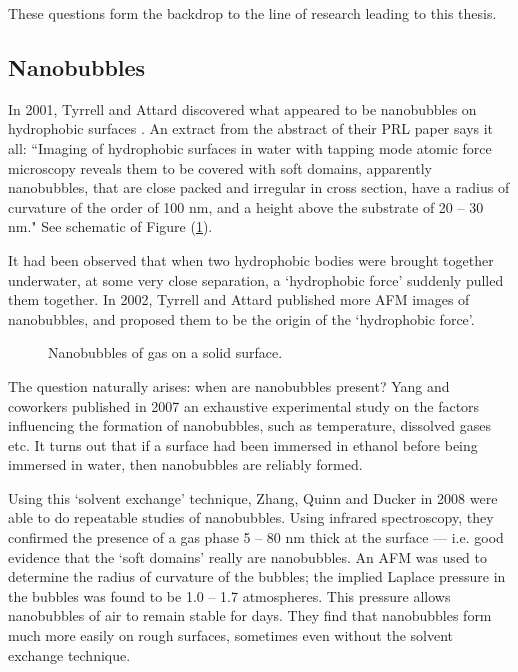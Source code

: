 \documentclass[12pt, a4paper, twoside, openright]{book}
\begin{document}
These questions form the backdrop to the line of research leading to this thesis.

\subsection{Nanobubbles}

In 2001, Tyrrell and Attard discovered what appeared to be nanobubbles on hydrophobic surfaces \cite{TyrrellAttard2001}.   An extract from the abstract of their PRL paper says it all: ``Imaging of hydrophobic surfaces in water with tapping mode atomic force microscopy reveals them to be covered with soft domains, apparently nanobubbles, that are close packed and irregular in cross section, have a radius of curvature of the order of 100 nm, and a height above the substrate of 20 -- 30 nm."  
See schematic of Figure (\ref{nanobubbles}).

It had been observed that when two hydrophobic bodies were brought together underwater, at some very close separation, a `hydrophobic force' suddenly pulled them together.  In 2002, Tyrrell and Attard published \cite{TyrrellAttard2002} more AFM images of nanobubbles, and proposed them to be the origin of the `hydrophobic force'.

\begin{figure}[ht]
\centering
{}
\caption{Nanobubbles of gas on a solid surface.}\label{nanobubbles}
\end{figure}

The question naturally arises: when are nanobubbles present?  Yang and coworkers published in 2007 \cite{Yang2007} an exhaustive experimental study on the factors influencing the formation of nanobubbles, such as temperature, dissolved gases etc.  It turns out that if a surface had been immersed in ethanol before being immersed in water, then nanobubbles are reliably formed.  

Using this `solvent exchange' technique, Zhang, Quinn and Ducker in 2008 \cite{ZhangQuinnDucker2007} were able to do repeatable studies of nanobubbles.  Using infrared spectroscopy, they confirmed the presence of a gas phase 5 -- 80 nm thick at the surface --- i.e. good evidence that the `soft domains' really are nanobubbles.
An AFM was used to determine the radius of curvature of the bubbles; the implied Laplace pressure in the bubbles was found to be 1.0 -- 1.7 atmospheres.  This pressure allows nanobubbles of air to remain stable for days.  They find that nanobubbles form much more easily on rough surfaces, sometimes even without the solvent exchange technique.
\end{document}
